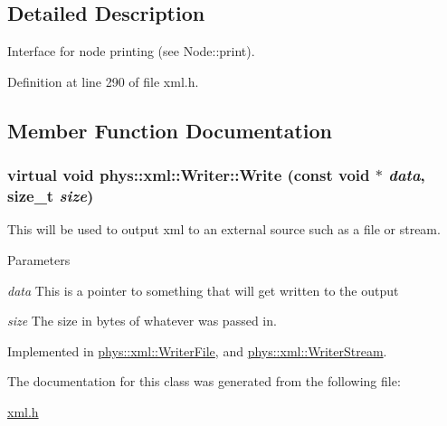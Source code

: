 \subsection{Detailed Description}
Interface for node printing (see Node::print). 

Definition at line 290 of file xml.h.



\subsection{Member Function Documentation}
\hypertarget{classphys_1_1xml_1_1Writer_ab6d4758ab53743f236eb64d5b2dd7e9e}{
\subsubsection[{Write}]{\setlength{\rightskip}{0pt plus 5cm}virtual void phys::xml::Writer::Write (const void $\ast$ {\em data}, \/  size\_\-t {\em size})}}
\label{d2/d28/classphys_1_1xml_1_1Writer_ab6d4758ab53743f236eb64d5b2dd7e9e}


This will be used to output xml to an external source such as a file or stream. 


\begin{DoxyParams}{Parameters}
\item[{\em data}]This is a pointer to something that will get written to the output \item[{\em size}]The size in bytes of whatever was passed in. \end{DoxyParams}


Implemented in \hyperlink{classphys_1_1xml_1_1WriterFile_a4c4348e30dc03b22f7d4ee15bd386ab2}{phys::xml::WriterFile}, and \hyperlink{classphys_1_1xml_1_1WriterStream_a74242c8abe03f6244d3464a663f75de9}{phys::xml::WriterStream}.



The documentation for this class was generated from the following file:\begin{DoxyCompactItemize}
\item 
\hyperlink{xml_8h}{xml.h}\end{DoxyCompactItemize}
